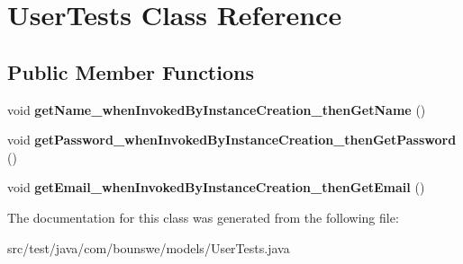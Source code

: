 \hypertarget{class_user_tests}{}\section{User\+Tests Class Reference}
\label{class_user_tests}
\subsection*{Public Member Functions}
\begin{DoxyCompactItemize}
\item 
\mbox{\label{class_user_tests_a654131cd884303c915b3cd3fda23d6e0}} 
void {\bfseries get\+Name\+\_\+when\+Invoked\+By\+Instance\+Creation\+\_\+then\+Get\+Name} ()
\item 
\mbox{\label{class_user_tests_ad1b09df79ba0d65d4f217b684f2d45f6}} 
void {\bfseries get\+Password\+\_\+when\+Invoked\+By\+Instance\+Creation\+\_\+then\+Get\+Password} ()
\item 
\mbox{\label{class_user_tests_af6e52aadfeacf5e299777c653270e824}} 
void {\bfseries get\+Email\+\_\+when\+Invoked\+By\+Instance\+Creation\+\_\+then\+Get\+Email} ()
\end{DoxyCompactItemize}


The documentation for this class was generated from the following file\+:\begin{DoxyCompactItemize}
\item 
src/test/java/com/bounswe/models/User\+Tests.\+java\end{DoxyCompactItemize}
